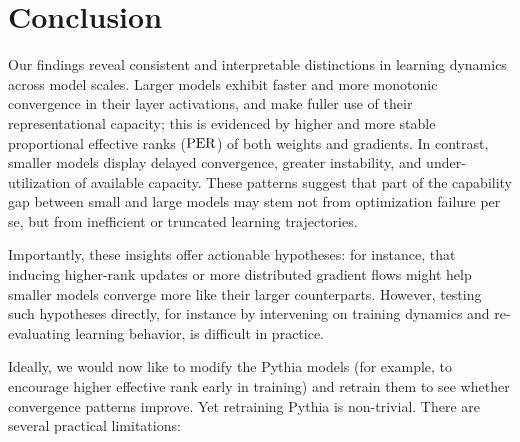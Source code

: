 \begin{table}[!t]
    \centering
    
    \caption{Matthew's Correlation Coefficient %
    between binary variables indicating whether a given layer converges early in training and whether it maintains a stable PER of the parameters ($\vtheta$) and gradients ($\nabla\vtheta$) throughout training for both $\attention$ and $\mlp$.}
    \label{tab:model_correlation}
\end{table}



\section{Conclusion}

Our findings reveal consistent and interpretable distinctions in learning dynamics across model scales. Larger models exhibit faster and more monotonic convergence in their layer activations, and make fuller use of their representational capacity; this is evidenced by higher and more stable proportional effective ranks ($\mathrm{PER}$) of both weights and gradients. In contrast, smaller models display delayed convergence, greater instability, and under-utilization of available capacity. These patterns suggest that part of the capability gap between small and large models may stem not from optimization failure per se, but from inefficient or truncated learning trajectories.

Importantly, these insights offer actionable hypotheses: for instance, that inducing higher-rank updates or more distributed gradient flows might help smaller models converge more like their larger counterparts. However, testing such hypotheses directly, for instance by intervening on training dynamics and re-evaluating learning behavior, is difficult in practice.

Ideally, we would now like to modify the Pythia models (for example, to encourage higher effective rank early in training) and retrain them to see whether convergence patterns improve. Yet retraining Pythia is non-trivial. There are several practical limitations:

